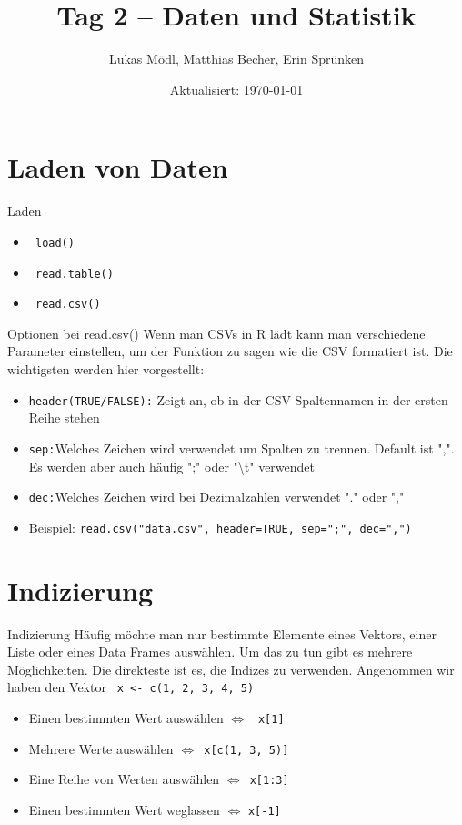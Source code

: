 \documentclass[aspectratio = 169]{chariteBeamer}
\author[L. Mödl, M. Becher, E. Sprünken]{Lukas Mödl, Matthias Becher, Erin Sprünken}
\title{Tag 2 -- Daten und Statistik}
\date[]{Aktualisiert: \today}
\begin{document}
\begin{frame}[plain]
    \titlepage%
\end{frame}
\frame{\tableofcontents}

\section{Laden von Daten}
\begin{frame}[fragile]{Laden}
  \begin{itemize}
	  \item \verb + load() +
	  \item  \verb + read.table() +
	  \item  \verb + read.csv() +
  \end{itemize}
\end{frame}

\begin{frame}[fragile]{Optionen bei read.csv()}
Wenn man CSVs in R lädt kann man verschiedene Parameter einstellen, um der Funktion zu sagen wie die CSV formatiert ist. Die wichtigsten werden hier vorgestellt:
  \begin{itemize}
	  \item \verb +header(TRUE/FALSE):+ Zeigt an, ob in der CSV Spaltennamen in der ersten Reihe stehen
	  \item \verb +sep:+Welches Zeichen wird verwendet um Spalten zu trennen. Default ist ",". Es werden aber auch häufig ";" oder "\textbackslash t" verwendet
	  \item \verb +dec:+Welches Zeichen wird bei Dezimalzahlen verwendet "." oder ","
	  \item	Beispiel: \verb +read.csv("data.csv", header=TRUE, sep=";", dec=",")+
  \end{itemize}
\end{frame}

\section{Indizierung}
\begin{frame}[fragile]{Indizierung}
	Häufig möchte man nur bestimmte Elemente eines Vektors, einer Liste oder eines Data Frames auswählen. Um das zu tun gibt es mehrere Möglichkeiten. Die direkteste ist es, die Indizes zu verwenden. Angenommen wir haben den Vektor \verb + x <- c(1, 2, 3, 4, 5) +
	\begin{itemize}
		\item  Einen bestimmten Wert auswählen $\Leftrightarrow$ \verb+ x[1]+
		\item  Mehrere Werte auswählen $\Leftrightarrow$\verb+ x[c(1, 3, 5)]+
		\item  Eine Reihe von Werten auswählen $\Leftrightarrow$\verb+ x[1:3]+
		\item  Einen bestimmten Wert weglassen $\Leftrightarrow$ \verb+x[-1]+
	\end{itemize}
\end{frame}
\end{document}

